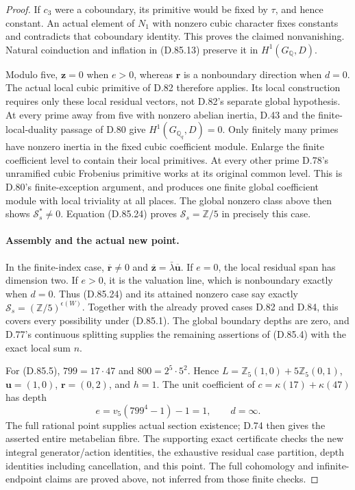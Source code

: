 \begin{proof}
If \(c_3\) were a coboundary, its primitive would be fixed
by \(\tau\), and hence constant. An actual element of
\(N_1\) with nonzero cubic character fixes constants and
contradicts that coboundary identity. This proves the claimed
nonvanishing. Natural coinduction and inflation in (D.85.13)
preserve it in \(H^1(G_{\mathbb Q},D)\).

Modulo five, \(\mathbf z=0\) when \(e>0\), whereas
\(\mathbf r\) is a nonboundary direction when \(d=0\).
The actual local cubic primitive of D.82 therefore applies.
Its local construction requires only these local residual
vectors, not D.82's separate global hypothesis.
At every prime away from five with nonzero abelian inertia,
D.43 and the finite-local-duality passage of D.80 give
\(H^1(G_{\mathbb Q_q},D)=0\). Only finitely many primes
have nonzero inertia in the fixed cubic coefficient module.
Enlarge the finite coefficient level to contain their local
primitives. At every other prime D.78's unramified cubic
Frobenius primitive works at its original common level.
This is D.80's finite-exception argument, and produces one
finite global coefficient module with local triviality at
all places. The global nonzero class above then shows
\(\mathcal S_s^*\ne0\). Equation (D.85.24) proves
\(\mathcal S_s=\mathbb Z/5\) in precisely this case.

\paragraph{Assembly and the actual new point.}
In the finite-index case, \(\overline{\mathbf r}\ne0\)
and \(\overline{\mathbf z}=\bar\lambda\overline{\mathbf u}\).
If \(e=0\), the local residual span has dimension two.
If \(e>0\), it is the valuation line, which is nonboundary
exactly when \(d=0\). Thus (D.85.24) and its attained
nonzero case say exactly \(\mathcal S_s=(\mathbb Z/5)^{\epsilon(W)}\).
Together with the already proved cases D.82 and D.84, this
covers every possibility under (D.85.1). The global boundary
depths are zero, and D.77's continuous splitting supplies
the remaining assertions of (D.85.4) with the exact local
sum \(n\).

For (D.85.5), \(799=17\cdot47\) and
\(800=2^5\cdot5^2\). Hence
\(L=\mathbb Z_5(1,0)+5\mathbb Z_5(0,1)\),
\(\mathbf u=(1,0)\), \(\mathbf r=(0,2)\), and \(h=1\).
The unit coefficient of \(c=\kappa(17)+\kappa(47)\)
has depth
\[
 e=v_5(799^4-1)-1=1,
 \qquad d=\infty.
                                                               \tag{D.85.26}
\]
The full rational point supplies actual section existence;
D.74 then gives the asserted entire metabelian fibre.
The supporting exact certificate checks the new integral
generator/action identities, the exhaustive residual case
partition, depth identities including cancellation, and
this point. The full cohomology and infinite-endpoint
claims are proved above, not inferred from those finite checks.
\end{proof}
